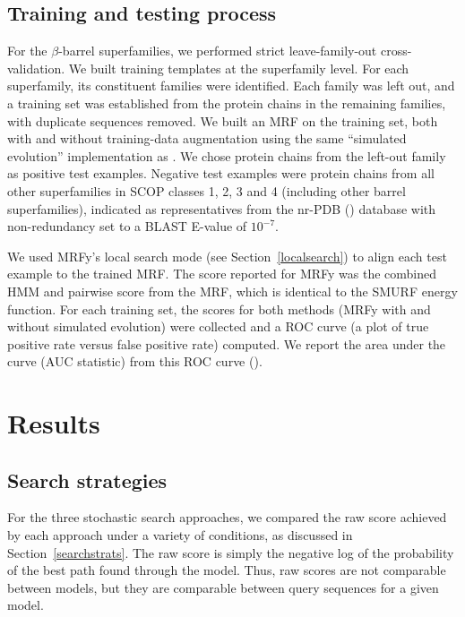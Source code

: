 \documentclass{acm_proc_article-sp}
\begin{document}
\subsection{Training and testing process} \label{mrfy-training}

For the $\beta$-barrel superfamilies, we performed strict leave-family-out 
cross-validation. 
We built training templates at the superfamily level. 
For each superfamily, its constituent families were identified. 
Each family was left out, and a training set was established from the protein 
chains in the remaining families, with duplicate sequences removed. 
We built an MRF on the training set, both with and without training-data
augmentation using the same ``simulated evolution'' implementation as 
\citet{Daniels:2012dg}.
We chose protein chains from the left-out family as positive test examples. 
Negative test examples were protein chains from all other superfamilies in SCOP 
classes 1, 2, 3 and 4 (including other barrel superfamilies), indicated as 
representatives from the nr-PDB (\cite{Berman:2000hl}) database with 
non-redundancy set to a BLAST E-value of $10^{-7}$.

We used MRFy's local search mode (see Section~\ref{localsearch}) to align each
test example to the trained MRF.
The score reported for MRFy was the combined HMM and pairwise score from the 
MRF, which is identical to the SMURF energy function.
For each training set, the scores for both methods (MRFy with and without
simulated evolution) were collected and a ROC curve (a plot of true positive 
rate versus false positive rate) computed. We report the area under the curve 
(AUC statistic) from this ROC curve (\cite{Sonego:2008uy}).



\section{Results}

\subsection{Search strategies}

For the three stochastic search approaches, we compared the raw score achieved
by each approach under a variety of conditions, as discussed in 
Section~\ref{searchstrats}.
The raw score is simply the negative log of the probability of the best path
found through the model.
Thus, raw scores are not comparable between models, but they are comparable
between query sequences for a given model.
\end{document}
